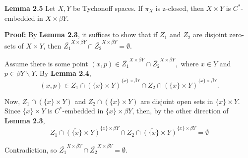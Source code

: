 \documentclass{article}
\begin{document}
\textbf{Lemma 2.5}  Let $X,Y$ be Tychonoff spaces. If $\pi_X$ is z-closed, then $X\times Y$ is $C^*$-embedded in $X\times \beta Y$.


\vskip 15pt


\textbf{Proof:} By \textbf{Lemma 2.3}, it suffices to show that if $Z_1$ and $Z_2$ are disjoint zero-sets of $X\times Y$, then $\overline{Z_1}^{X\times \beta Y} \cap \overline{Z_2}^{X\times \beta Y}=\emptyset.$

\vskip 15pt

 Assume there is some point $(x,p)\in \overline{Z_1}^{X\times \beta Y}\cap \overline{Z_2}^{X\times \beta Y},$ where $x\in Y$ and $p\in \beta Y\backslash Y$. By \textbf{Lemma 2.4}, $$(x,p)\in \overline{Z_1\cap (\{x\}\times Y)}^{\{x\}\times \beta Y} \cap \overline{Z_2\cap (\{x\}\times Y)}^{\{x\}\times \beta Y}.$$

\vskip 10pt

Now, $Z_1\cap (\{x\}\times Y)$ and $Z_2\cap (\{x\} \times Y)$ are disjoint open sets in $\{x\}\times Y$. Since $\{x\}\times Y$ is $C^*$-embedded in $\{x\}\times \beta Y$, then, by the other direction of \textbf{Lemma 2.3}, $$\overline{Z_1\cap (\{x\}\times Y)}^{\{x\}\times \beta Y} \cap \overline{Z_2\cap (\{x\}\times Y)}^{\{x\}\times \beta Y}=\emptyset$$

Contradiction, so $\overline{Z_1}^{X\times \beta Y} \cap \overline{Z_2}^{X\times \beta Y} =\emptyset$. 
\end{document}
